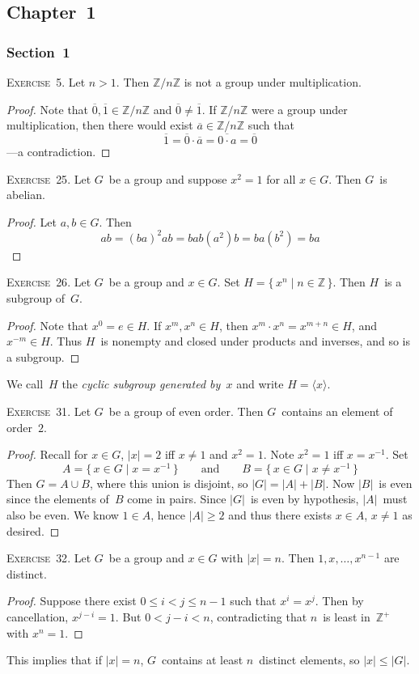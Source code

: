 \documentclass[letterpaper]{article}
\newcommand{\exercise}[1]{\goodbreak\noindent\textsc{Exercise~{#1}.}}
\newcommand{\Z}{\mathbb{Z}}
\newcommand{\union}{\cup}
\newcommand{\res}[1]{\overline{#1}}
\newcommand{\ord}[1]{|{#1}|}
\newcommand{\cyc}[1]{\langle{#1}\rangle}
\begin{document}
\subsection*{Chapter~1}
\subsubsection*{Section~1}
\exercise{5}
Let $n>1$. Then $\Z/n\Z$ is not a group under multiplication.
\begin{proof}
Note that $\res{0},\res{1}\in\Z/n\Z$ and $\res{0}\ne\res{1}$. If $\Z/n\Z$ were a group under multiplication, then there would exist $\res{a}\in\Z/n\Z$ such that
$$\res{1}=\res{0}\cdot\res{a}=\res{0\cdot a}=\res{0}$$
---a contradiction.
\end{proof}

\exercise{25}
Let $G$~be a group and suppose $x^2=1$ for all $x\in G$. Then $G$~is abelian.
\begin{proof}
Let $a,b\in G$. Then
$$ab=(ba)^2ab=bab(a^2)b=ba(b^2)=ba$$
\end{proof}

\exercise{26}
Let $G$~be a group and $x\in G$. Set $H=\{\,x^n\mid n\in\Z\,\}$. Then $H$~is a subgroup of~$G$.
\begin{proof}
Note that $x^0=e\in H$. If $x^m,x^n\in H$, then $x^m\cdot x^n=x^{m+n}\in H$, and $x^{-m}\in H$. Thus $H$~is nonempty and closed under products and inverses, and so is a subgroup.
\end{proof}
\noindent We call~$H$ the \emph{cyclic subgroup generated by~$x$} and write $H=\cyc{x}$.

\bigskip
\exercise{31}
Let $G$~be a group of even order. Then $G$~contains an element of order~$2$.
\begin{proof}
Recall for $x\in G$,  $\ord{x}=2$ iff $x\ne 1$ and $x^2=1$. Note $x^2=1$ iff $x=x^{-1}$. Set
$$A=\{\,x\in G\mid x=x^{-1}\,\}\qquad\text{and}\qquad B=\{\,x\in G\mid x\ne x^{-1}\,\}$$
Then $G=A\union B$, where this union is disjoint, so $\ord{G}=\ord{A}+\ord{B}$. Now $\ord{B}$~is even since the elements of~$B$ come in pairs. Since $\ord{G}$~is even by hypothesis, $\ord{A}$~must also be even. We know $1\in A$, hence $\ord{A}\ge 2$ and thus there exists $x\in A$, $x\ne 1$ as desired.
\end{proof}

\exercise{32}
Let $G$~be a group and $x\in G$ with $\ord{x}=n$. Then $1,x,\ldots,x^{n-1}$ are distinct.
\begin{proof}
Suppose there exist $0\le i<j\le n-1$ such that $x^i=x^j$. Then by cancellation, $x^{j-i}=1$. But $0<j-i<n$, contradicting that $n$~is least in~$\Z^+$ with $x^n=1$.
\end{proof}
\noindent This implies that if $\ord{x}=n$, $G$~contains at least $n$~distinct elements, so $\ord{x}\le\ord{G}$.
\end{document}
